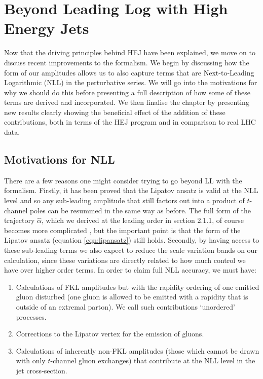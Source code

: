\chapter{Beyond Leading Log with High Energy Jets}

Now that the driving principles behind HEJ have been explained, we move on to discuss recent improvements to the formalism. We begin by discussing how the form of our amplitudes allows us to also capture terms that are Next-to-Leading Logarithmic (NLL) in the perturbative series. We will go into the motivations for why we should do this before presenting a full description of how some of these terms are derived and incorporated. We then finalise the chapter by presenting new results clearly showing the beneficial effect of the addition of these contributions, both in terms of the HEJ program and in comparison to real LHC data. 

\section{Motivations for NLL}

There are a few reasons one might consider trying to go beyond LL with the formalism. Firstly, it has been proved that the Lipatov ansatz is valid at the NLL level \cite{Fadin2006} and so any sub-leading amplitude that still factors out into a product of $t$-channel poles can be resummed in the same way as before. The full form of the trajectory $\hat{\alpha}$, which we derived at the leading order in section 2.1.1, of course becomes more complicated \cite{Fadin2003}, but the important point is that the form of the Lipatov ansatz (equation \ref{eqn:lipansatz}) still holds. Secondly, by having access to these sub-leading terms we also expect to reduce the scale variation bands on our calculation, since these variations are directly related to how much control we have over higher order terms. In order to claim full NLL accuracy, we must have:

\begin{enumerate}
\item{Calculations of FKL amplitudes but with the rapidity ordering of one emitted gluon disturbed (one gluon is allowed to be emitted with a rapidity that is outside of an extremal parton). We call such contributions `unordered' processes.}
\item{Corrections to the Lipatov vertex for the emission of gluons.}
\item{Calculations of inherently non-FKL amplitudes (those which cannot be drawn with only $t$-channel gluon exchanges) that contribute at the NLL level in the jet cross-section.}
\end{enumerate}

